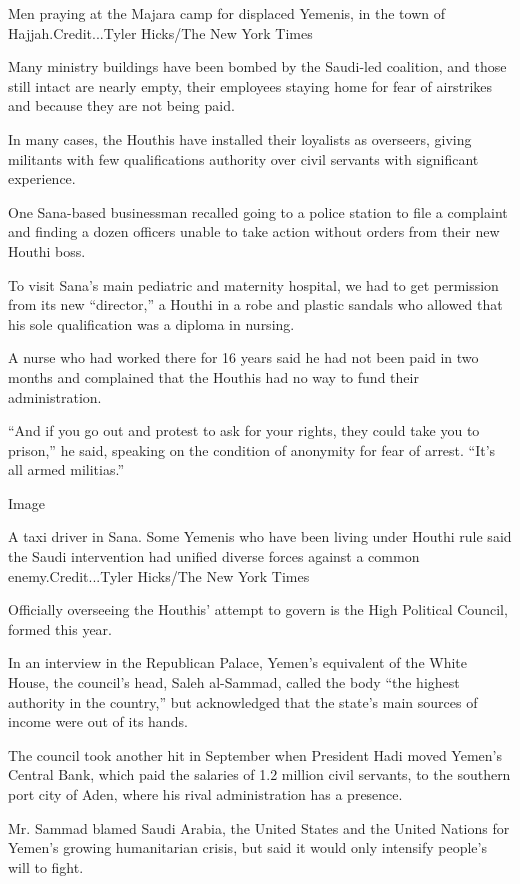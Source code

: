 Men praying at the Majara camp for displaced Yemenis, in the town of
Hajjah.Credit...Tyler Hicks/The New York Times

Many ministry buildings have been bombed by the Saudi-led coalition, and
those still intact are nearly empty, their employees staying home for
fear of airstrikes and because they are not being paid.

In many cases, the Houthis have installed their loyalists as overseers,
giving militants with few qualifications authority over civil servants
with significant experience.

One Sana-based businessman recalled going to a police station to file a
complaint and finding a dozen officers unable to take action without
orders from their new Houthi boss.

To visit Sana's main pediatric and maternity hospital, we had to get
permission from its new ``director,'' a Houthi in a robe and plastic
sandals who allowed that his sole qualification was a diploma in
nursing.

A nurse who had worked there for 16 years said he had not been paid in
two months and complained that the Houthis had no way to fund their
administration.

``And if you go out and protest to ask for your rights, they could take
you to prison,'' he said, speaking on the condition of anonymity for
fear of arrest. ``It's all armed militias.''

Image

A taxi driver in Sana. Some Yemenis who have been living under Houthi
rule said the Saudi intervention had unified diverse forces against a
common enemy.Credit...Tyler Hicks/The New York Times

Officially overseeing the Houthis' attempt to govern is the High
Political Council, formed this year.

In an interview in the Republican Palace, Yemen's equivalent of the
White House, the council's head, Saleh al-Sammad, called the body ``the
highest authority in the country,'' but acknowledged that the state's
main sources of income were out of its hands.

The council took another hit in September when President Hadi moved
Yemen's Central Bank, which paid the salaries of 1.2 million civil
servants, to the southern port city of Aden, where his rival
administration has a presence.

Mr. Sammad blamed Saudi Arabia, the United States and the United Nations
for Yemen's growing humanitarian crisis, but said it would only
intensify people's will to fight.

